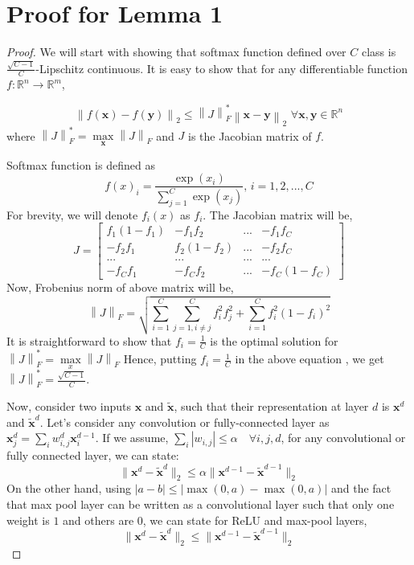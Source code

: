 \documentclass{article} \usepackage{iclr2018_conference,times}
\begin{document}
\section{Proof for Lemma 1}
\begin{proof}
We will start with showing that softmax function defined over $C$ class is $\frac{\sqrt{C-1}}{C}$-Lipschitz continuous. It is easy to show that for any differentiable function \mbox{$f:\mathbb{R}^n\rightarrow\mathbb{R}^m$},

\[
\left \| f(\mathbf{x})-f(\mathbf{y})\right \|_2 \leq \left \|J\right \|^*_F  \left\| \mathbf{x}-\mathbf{y}\right\|_2  \, \, \forall \mathbf{x},\mathbf{y}\in\mathbb{R}^n
\]
where $\left \|J\right \|^*_F = \max\limits_{\mathbf{x}} \left \|J\right \|_F$ and $J$ is the Jacobian matrix of $f$.

Softmax function is defined as
\[
f(x)_i = \frac{\exp(x_i)}{\sum\limits_{j=1}^{C}\exp(x_j)}, \, i={1,2,...,C}
\]
For brevity, we will denote $f_i(x)$ as $f_i$. The Jacobian matrix will be,
\[
J = \begin{bmatrix} f_1(1-f_1) & -f_1f_2  & ... & -f_1f_C \\
-f_2f_1 & f_2(1-f_2)  & ...  & -f_2f_C \\
... & ... & ... & ...  \\
-f_{C}f_{1} & -f_{C}f_{2}  & ...  & -f_{C}(1-f_{C})
\end{bmatrix}
\]
Now, Frobenius norm of above matrix will be,
\[
\left \| J \right \|_F = \sqrt{\sum\limits_{i=1}^{C}\sum\limits_{j=1, i\neq j}^{C}f_{i}^{2}f_{j}^{2} + \sum\limits_{i=1}^{C} f_i^2(1-f_i)^2}
\]
It is straightforward to show that $f_i = \frac{1}{C}$ is the optimal solution for $\left \| J \right \|^{*}_F = \max\limits_{x}\left \| J \right \|_F $ Hence, putting $f_i = \frac{1}{C}$ in the above equation , we get \mbox{$\left \| J \right \|^{*}_F = \frac{\sqrt{C-1}}{C}$}.

Now, consider two inputs $\mathbf{x}$ and $\mathbf{\tilde{x}}$, such that their representation at layer $d$ is $\mathbf{x}^d$ and $\mathbf{\tilde{x}}^d$. Let's consider any convolution or fully-connected layer as $\mathbf{x}^d_j = \sum_i w_{i,j}^d \mathbf{x}^{d-1}_i$. If we assume, \mbox{$\sum_i |w_{i,j}| \leq \alpha \quad \forall i,j,d$}, for any convolutional or fully connected layer, we can state:
\[
\|\mathbf{x}^d - \mathbf{\tilde{x}}^d\|_2 \leq  \alpha \|\mathbf{x}^{d-1} - \mathbf{\tilde{x}}^{d-1}\|_2
\] 
On the other hand, using $|a-b| \leq |\max(0, a) - \max(0,a)|$ and the fact that max pool layer can be written as a convolutional layer such that only one weight is $1$ and others are $0$, we can state for ReLU and max-pool layers,
\[
\|\mathbf{x}^d - \mathbf{\tilde{x}}^d\|_2 \leq  \|\mathbf{x}^{d-1} - \mathbf{\tilde{x}}^{d-1}\|_2
\] 


\end{proof}
\end{document}

